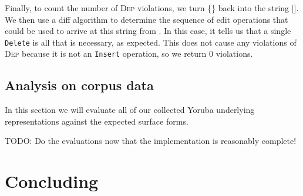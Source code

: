 \documentclass[12pt]{article}
\newcommand{\dep}{\textsc{Dep}}
\begin{document}
Finally, to count the number of \dep{} violations, we turn
\{\} back into the string
[]. We then use a diff algorithm to determine
the sequence of edit operations that could be used to arrive at this
string from . In this case, it tells us
that a single \texttt{Delete} is all that is necessary, as expected.
This does not cause any violations of \dep{} because it is not an
\texttt{Insert} operation, so we return 0 violations.

\subsection{Analysis on corpus data}

In this section we will evaluate all of our collected Yoruba underlying
representations against the expected surface forms.

TODO: Do the evaluations now that the implementation is reasonably
complete!

\section{Concluding}

\printbibliography
\end{document}
